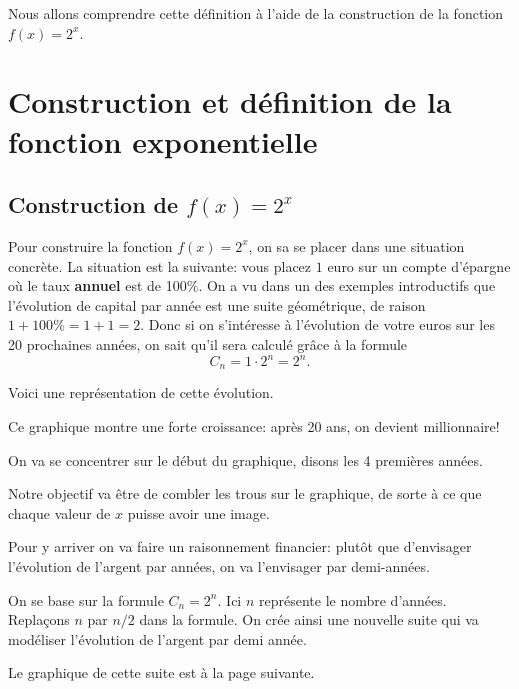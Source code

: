 \documentclass[a4paper,12pt,singlepage]{report}
\begin{document}
Nous allons comprendre cette définition à l'aide de la construction de la
fonction \(f(x)=2^x\).
\section{Construction et définition de la fonction exponentielle}
\label{sec:org6d50c06}
\subsection{Construction de \(f(x)=2^{x}\)}
\label{sec:org173859f}

Pour construire la fonction \(f(x)=2^x\), on sa se placer dans une situation
concrète. La situation est la suivante: vous placez \(1\) euro sur un compte
d'épargne où le taux \textbf{annuel} est de 100\(\%\). On a vu dans un des exemples
introductifs que l'évolution de capital par année est une suite géométrique, de
raison \(1+100\%=1+1=2\). Donc si on s'intéresse à l'évolution de votre euros sur
les 20 prochaines années, on sait qu'il sera calculé grâce à la formule
\[
C_n=1\cdot 2^n=2^n.
\]

Voici une représentation de cette évolution.

\begin{center}

\end{center}

Ce graphique montre une forte croissance: après 20 ans, on devient millionnaire!

On va se concentrer sur le début du graphique, disons les 4 premières années.



\par \setlength{\columnseprule}{0 pt}
          \begin{minipage}[t]{\linewidth}
          \begin{multicols}{2}


\columnbreak

Notre objectif va être de combler les trous sur le graphique, de sorte à ce
que chaque valeur de \(x\) puisse avoir une image.

Pour y arriver on va faire un raisonnement financier: plutôt que d'envisager
l'évolution de l'argent par années, on va l'envisager par demi-années.

On se base sur la formule \(C_n=2^n\). Ici \(n\) représente le nombre
d'années. Replaçons \(n\) par \(n/2\) dans la formule. On crée ainsi une nouvelle
suite qui va modéliser l'évolution de l'argent par demi année.

Le graphique de cette suite est à la page suivante.




\end{multicols}\end{minipage}
\begin{center}

\end{center}
\end{document}
